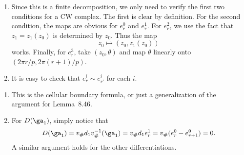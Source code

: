 \documentclass[../../solutions.tex]{subfiles}
\begin{document}
\begin{exercise} \leavevmode
\begin{enumerate}
\item 
Since this is a finite decomposition, we only need to verify the first two conditions for a CW complex.
The first is clear by definition.
For the second condition, the maps are obvious for $e^0_r$ and $e^1_r$.
For $e^2_r$, we use the fact that $z_1=z_1(z_0)$ is determined by $z_0$.
Thus the map
\[z_0\mapsto(z_0,z_1(z_0))\]
works.
Finally, for $e^3_r$, take $(z_0,\theta)$ and map $\theta$ linearly onto $(2\pi r/p,2\pi(r+1)/p)$.

\item
It is easy to check that $e^i_r\sim e^i_{r'}$ for each $i$.
\end{enumerate}
\end{exercise}

\begin{exercise} \leavevmode
\begin{enumerate}
\item 
This is the cellular boundary formula, or just a generalization of the argument for Lemma~8.46.
\item
For $D(\ga_1)$, simply notice that
\[D(\ga_1)=v_\#d_1v_\#^{-1}(\ga_1)=v_\#d_1e^1_r=v_\#(e^0_r-e^0_{r+1})=0.\]
A similar argument holds for the other differentiations.
\end{enumerate}
\end{exercise}
\end{document}

